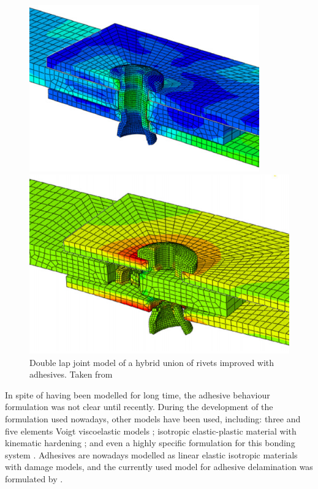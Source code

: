 \documentclass[
documentsize = a4, %
font = cmr, %
typesize = 11, %
printmode = true,
onehalfspacing = true,
language = en, %
titlepage = udciccp, %
degree = pt, %
dedication = true,
acknowledgements = true,
abstract-en = true,
abstract-es = false,
abstract-ga = false,
epigraphs = true,
toc = true,
lof = true,
lot = true,
frontmatterintoc = false,
notation = false,
minimal = false,
]{UDCthesis}
\begin{document}
\begin{itemize}
\begin{figure}
\begin{minipage}[b]{.2\linewidth}
			\includegraphics[width=\linewidth]{IMG_CUTRES/sadowski_riv3}
		\end{minipage}
		\quad
		\begin{minipage}[b]{.2\linewidth}
			\centering
			\includegraphics[width=\linewidth]{IMG_CUTRES/sadowski_riv4}
		\end{minipage}
		\caption[Double lap joint test of a hybrid union of rivets improved with adhesives.]{Double lap joint model of a hybrid union of rivets improved with adhesives. Taken from \citet{Sadowski2010}}
		\label{fig:sadowski_riv}
	\end{figure}

\end{itemize}

In spite of having been modelled for long time, the adhesive behaviour formulation was not clear until recently. During the development of the formulation used nowadays, other models have been used, including: three and five elements Voigt viscoelastic models \citep{Sato2000}; isotropic elastic-plastic material with kinematic hardening \citep{Vaidya2006}; and even a highly specific formulation for this bonding system \citep{Greve2007}. Adhesives are nowadays modelled as linear elastic isotropic materials with damage models, and the currently used model for adhesive delamination was formulated by \citet{Alfano2001}.
\end{document}

